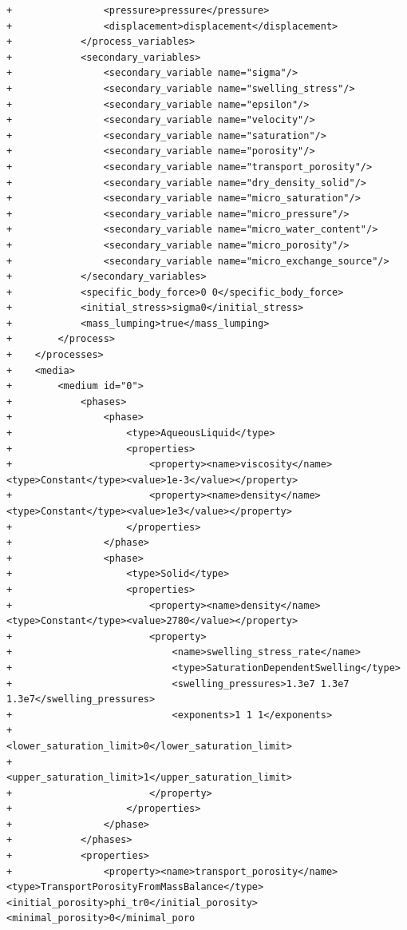 \documentclass[10pt]{article}
\begin{document}
\begin{lstlisting}
+                <pressure>pressure</pressure>
+                <displacement>displacement</displacement>
+            </process_variables>
+            <secondary_variables>
+                <secondary_variable name="sigma"/>
+                <secondary_variable name="swelling_stress"/>
+                <secondary_variable name="epsilon"/>
+                <secondary_variable name="velocity"/>
+                <secondary_variable name="saturation"/>
+                <secondary_variable name="porosity"/>
+                <secondary_variable name="transport_porosity"/>
+                <secondary_variable name="dry_density_solid"/>
+                <secondary_variable name="micro_saturation"/>
+                <secondary_variable name="micro_pressure"/>
+                <secondary_variable name="micro_water_content"/>
+                <secondary_variable name="micro_porosity"/>
+                <secondary_variable name="micro_exchange_source"/>
+            </secondary_variables>
+            <specific_body_force>0 0</specific_body_force>
+            <initial_stress>sigma0</initial_stress>
+            <mass_lumping>true</mass_lumping>
+        </process>
+    </processes>
+    <media>
+        <medium id="0">
+            <phases>
+                <phase>
+                    <type>AqueousLiquid</type>
+                    <properties>
+                        <property><name>viscosity</name><type>Constant</type><value>1e-3</value></property>
+                        <property><name>density</name><type>Constant</type><value>1e3</value></property>
+                    </properties>
+                </phase>
+                <phase>
+                    <type>Solid</type>
+                    <properties>
+                        <property><name>density</name><type>Constant</type><value>2780</value></property>
+                        <property>
+                            <name>swelling_stress_rate</name>
+                            <type>SaturationDependentSwelling</type>
+                            <swelling_pressures>1.3e7 1.3e7 1.3e7</swelling_pressures>
+                            <exponents>1 1 1</exponents>
+                            <lower_saturation_limit>0</lower_saturation_limit>
+                            <upper_saturation_limit>1</upper_saturation_limit>
+                        </property>
+                    </properties>
+                </phase>
+            </phases>
+            <properties>
+                <property><name>transport_porosity</name><type>TransportPorosityFromMassBalance</type><initial_porosity>phi_tr0</initial_porosity><minimal_porosity>0</minimal_poro

\end{lstlisting}
\end{document}
